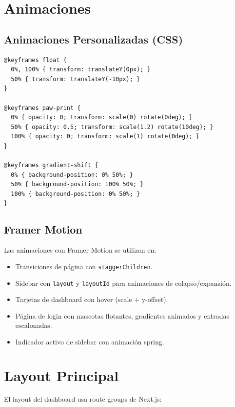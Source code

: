 \section{Animaciones}

\subsection{Animaciones Personalizadas (CSS)}

\begin{lstlisting}[style=css, caption=Animaciones CSS personalizadas]
@keyframes float {
  0%, 100% { transform: translateY(0px); }
  50% { transform: translateY(-10px); }
}

@keyframes paw-print {
  0% { opacity: 0; transform: scale(0) rotate(0deg); }
  50% { opacity: 0.5; transform: scale(1.2) rotate(10deg); }
  100% { opacity: 0; transform: scale(1) rotate(0deg); }
}

@keyframes gradient-shift {
  0% { background-position: 0% 50%; }
  50% { background-position: 100% 50%; }
  100% { background-position: 0% 50%; }
}
\end{lstlisting}

\subsection{Framer Motion}

Las animaciones con Framer Motion se utilizan en:

\begin{itemize}[leftmargin=*]
    \item Transiciones de p\'agina con \texttt{staggerChildren}.
    \item Sidebar con \texttt{layout} y \texttt{layoutId} para animaciones
          de colapso/expansi\'on.
    \item Tarjetas de dashboard con hover (scale + y-offset).
    \item P\'agina de login con mascotas flotantes, gradientes animados
          y entradas escalonadas.
    \item Indicador activo de sidebar con animaci\'on spring.
\end{itemize}

\section{Layout Principal}

El layout del dashboard usa route groups de Next.js:

